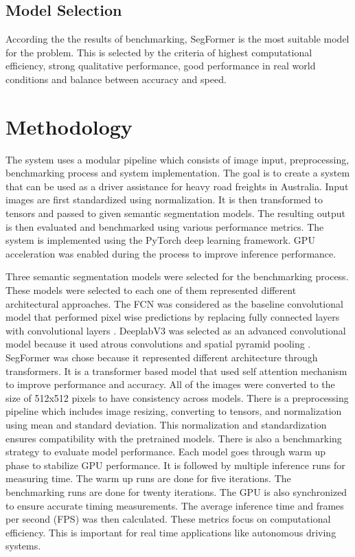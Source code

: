 \documentclass[10pt,journal,compsoc]{IEEEtran}
\begin{document}
\subsection{Model Selection}
According the the results of benchmarking, SegFormer is the most suitable model for the problem. This is selected by the criteria of highest computational efficiency, strong qualitative performance, good performance in real world conditions and balance between accuracy and speed.

\section{Methodology}
The system uses a modular pipeline which consists of image input, preprocessing, benchmarking process and system implementation. The goal is to create a system that can be used as a driver assistance for heavy road freights in Australia. Input images are first standardized using normalization. It is then transformed to tensors and passed to given semantic segmentation models. The resulting output is then evaluated and benchmarked using various performance metrics. The system is implemented using the PyTorch deep learning framework. GPU acceleration was enabled during the process to improve inference performance.

Three semantic segmentation models were selected for the benchmarking process. These models were selected to each one of them represented different architectural approaches. The FCN was considered as the baseline convolutional model that performed pixel wise predictions by replacing fully connected layers with convolutional layers \cite{long2015fullyconvolutionalnetworkssemantic}. DeeplabV3 was selected as an advanced convolutional model because it used atrous convolutions and spatial pyramid pooling \cite{chen2018encoder}. SegFormer was chose because it represented different architecture through transformers. It is a transformer based model that used self attention mechanism to improve performance and accuracy. All of the images were converted to the size of 512x512 pixels to have consistency across models. There is a preprocessing pipeline which includes image resizing, converting to tensors, and normalization using mean and standard deviation. This normalization and standardization ensures compatibility with the pretrained models. There is also a benchmarking strategy to evaluate model performance. Each model goes through warm up phase to stabilize GPU performance. It is followed by multiple inference runs for measuring time. The warm up runs are done for five iterations. The benchmarking runs are done for twenty iterations. The GPU is also synchronized to ensure accurate timing measurements. The average inference time and frames per second (FPS) was then calculated. These metrics focus on computational efficiency. This is important for real time applications like autonomous driving systems.
\end{document}
